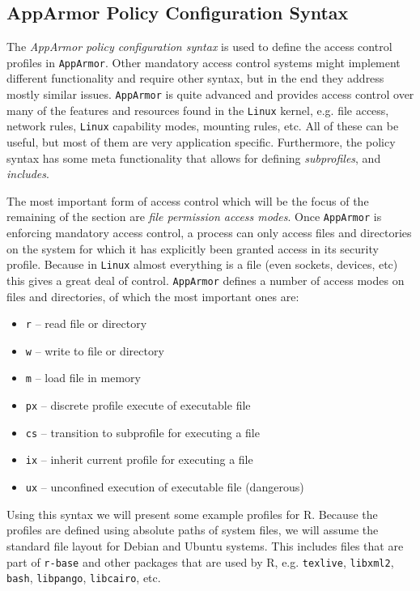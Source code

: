 \documentclass[article]{jss}
\newcommand{\R}{\textsf{R}\xspace}
\newcommand{\AppArmor}{\texttt{AppArmor}\xspace}
\newcommand{\Linux}{\texttt{Linux}\xspace}
\begin{document}
\subsection{AppArmor Policy Configuration Syntax}
\label{syntax}

The \emph{AppArmor policy configuration syntax} is used to define the access
control profiles in \AppArmor. Other mandatory access control systems
might implement different functionality and require other syntax, but in the end
they address mostly similar issues. \AppArmor is quite advanced and provides
access control over many of the features and resources found in the \Linux
kernel, e.g. file access, network rules, \Linux capability modes, mounting
rules, etc. All of these can be useful, but most of them are very application
specific. Furthermore, the policy syntax has some meta functionality that
allows for defining \emph{subprofiles}, and \emph{includes}.

The most important form of access control which will be the focus of the
remaining of the section are \emph{file permission access modes}. Once \AppArmor
is enforcing mandatory access control, a process can only access files and
directories on the system for which it has explicitly been granted access in
its security profile. Because in \Linux almost everything is a file
(even sockets, devices, etc) this gives a great deal of control. \AppArmor
defines a number of access modes on files and directories, of which the most
important ones are:

\begin{itemize}
  \item[] \texttt{r} -- read file or directory
  \item[] \texttt{w} -- write to file or directory
  \item[] \texttt{m} -- load file in memory
  \item[] \texttt{px} -- discrete profile execute of executable file
  \item[] \texttt{cs} -- transition to subprofile for executing a file
  \item[] \texttt{ix} -- inherit current profile for executing a file
  \item[] \texttt{ux} -- unconfined execution of executable file (dangerous)
\end{itemize}

Using this syntax we will present some example profiles for \R. Because the
profiles are defined using absolute paths of system files, we will assume the
standard file layout for Debian and Ubuntu systems. This includes files that
are part of \texttt{r-base} and other packages that are used by \R, e.g.
\texttt{texlive}, \texttt{libxml2}, \texttt{bash}, \texttt{libpango},
\texttt{libcairo}, etc.
\end{document}
